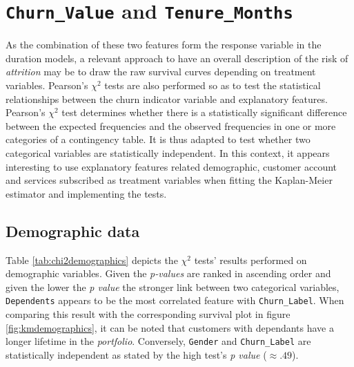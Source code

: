 \documentclass[
]{book}
\begin{document}
\hypertarget{churndescstats}{%
\section{\texorpdfstring{\texttt{Churn\_Value} and \texttt{Tenure\_Months}}{Churn\_Value and Tenure\_Months}}\label{churndescstats}}

As the combination of these two features form the response variable in the duration models, a relevant approach to have an overall description of the risk of \emph{attrition} may be to draw the raw survival curves depending on treatment variables. Pearson's \(\chi^2\) tests are also performed so as to test the statistical relationships between the churn indicator variable and explanatory features. Pearson's \(\chi^2\) test determines whether there is a statistically significant difference between the expected frequencies and the observed frequencies in one or more categories of a contingency table. It is thus adapted to test whether two categorical variables are statistically independent. In this context, it appears interesting to use explanatory features related demographic, customer account and services subscribed as treatment variables when fitting the Kaplan-Meier estimator and implementing the tests.

\hypertarget{demographic-data}{%
\subsection*{Demographic data}\label{demographic-data}}

Table \ref{tab:chi2demographics} depicts the \(\chi^2\) tests' results performed on demographic variables. Given the \emph{p-values} are ranked in ascending order and given the lower the \emph{p value} the stronger link between two categorical variables, \texttt{Dependents} appears to be the most correlated feature with \texttt{Churn\_Label}. When comparing this result with the corresponding survival plot in figure \ref{fig:kmdemographics}, it can be noted that customers with dependants have a longer lifetime in the \emph{portfolio}. Conversely, \texttt{Gender} and \texttt{Churn\_Label} are statistically independent as stated by the high test's \emph{p value} (\(\approx .49\)).
\end{document}
